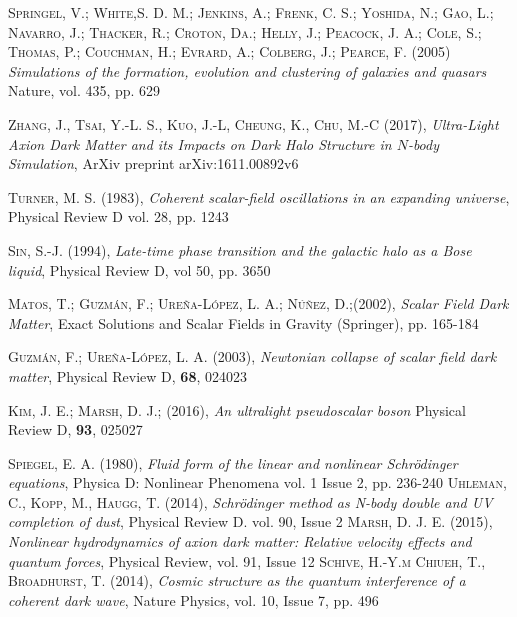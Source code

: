 \documentclass[a4paper,openright,10pt, oneside, final]{book}
\begin{document}
\begin{thebibliography}{a}
 \textsc{Springel, V.; White,S. D. M.; Jenkins, A.; Frenk, C. S.; Yoshida, N.; Gao, L.; Navarro, J.; Thacker, R.; Croton, Da.; Helly, J.; Peacock, J. A.; Cole, S.; Thomas, P.; Couchman, H.; Evrard, A.; Colberg, J.; Pearce, F. (2005)}
\textit{Simulations of the formation, evolution and clustering of galaxies and quasars}
Nature, vol. 435, pp. 629

 \textsc{Zhang, J., Tsai, Y.-L. S., Kuo, J.-L, Cheung, K., Chu, M.-C (2017)},
\textit{Ultra-Light Axion Dark Matter and its Impacts on Dark Halo Structure in $N$-body Simulation},
ArXiv preprint  arXiv:1611.00892v6

\textsc{Turner, M. S. (1983)},
\textit{Coherent scalar-field oscillations in an expanding universe},
Physical Review D vol. 28, pp. 1243

 \textsc{Sin, S.-J. (1994)},
\textit{Late-time phase transition and the galactic halo as a Bose liquid},
Physical Review D, vol 50, pp. 3650

 \textsc{Matos, T.; Guzmán, F.; Ureña-López, L. A.; Núñez, D.;(2002)},
\textit{Scalar Field Dark Matter},
Exact Solutions and Scalar Fields in Gravity (Springer), pp. 165-184

 \textsc{Guzmán, F.; Ureña-López, L. A. (2003)},
\textit{Newtonian collapse of scalar field dark matter},
Physical Review D, \textbf{68}, 024023

 \textsc{Kim, J. E.; Marsh, D. J.; (2016)},
\textit{An ultralight pseudoscalar boson}
Physical Review D, \textbf{93}, 025027


 \textsc{Spiegel, E. A. (1980)},
\textit{Fluid form of the linear and nonlinear Schrödinger equations},
Physica D: Nonlinear Phenomena vol. 1 Issue 2, pp. 236-240 
 \textsc{Uhleman, C., Kopp, M., Haugg, T. (2014)},
\textit{Schrödinger method as N-body double and UV completion of dust},
Physical Review D. vol. 90, Issue 2 
\textsc{Marsh, D. J. E. (2015)},
\textit{Nonlinear hydrodynamics of axion dark matter: Relative velocity effects and quantum forces},
Physical Review, vol. 91, Issue 12
 \textsc{Schive, H.-Y.m Chiueh, T., Broadhurst, T. (2014)},
\textit{Cosmic structure as the quantum interference of a coherent dark wave},
Nature Physics, vol. 10, Issue 7, pp. 496


\end{thebibliography}
\end{document}
